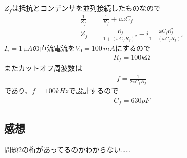 \documentclass[../../master.tex]{subfiles}
\begin{document}
\subsection{}
\(Z_f\)は抵抗とコンデンサを並列接続したものなので
\begin{align}
    \frac{1}{Z_f} &= \frac{1}{R_f} + i\omega C_f\\
    Z_f &= \frac{R_f}{1+(\omega C_fR_f)^2} -i \frac{\omega C_fR_f^2}{1+(\omega C_fR_f)^2}
\end{align}
\(I_i=1\,\si{\micro A}\)の直流電流を\(V_0 = 100 \,\si{mA}\)にするので
\begin{align}
    R_f = 100 \si{k\ohm}
\end{align}
またカットオフ周波数は
\begin{align}
    f = \frac{1}{2\pi C_fR_f}
\end{align}
であり、\(f=100 \si{kHz}\)で設計するので
\begin{align}
    C_f = 630 \si{pF}
\end{align}

\subsection*{感想}
問題2の桁があってるのかわからない……
\end{document}
